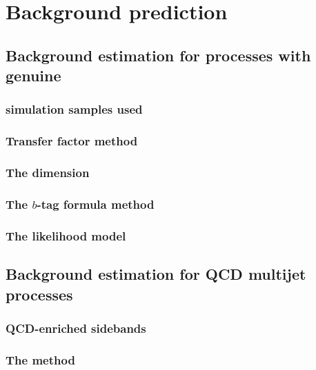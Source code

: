 \chapter{Background prediction} %
\label{chap:backgroundPred}

\section{Background estimation for processes with genuine \MET}

\subsection{\MC simulation samples used}

\subsection{Transfer factor method}

\subsection{The \MHT dimension} %
\label{sec:mhtDim}


\subsection{The $b$-tag formula method}

\subsection{The likelihood model} %

\section{Background estimation for QCD multijet processes} %
\label{sec:qcdEstimation}

\subsection{QCD-enriched sidebands}

\subsection{The method}

